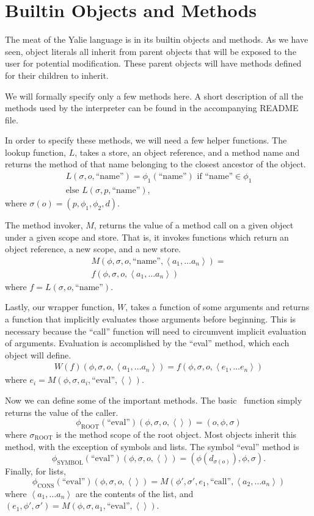\documentclass[twocolumn]{article}
\begin{document}
\section*{Builtin Objects and Methods}
The meat of the Yalie language is in its builtin objects and
methods. As we have seen, object literals all inherit from parent
objects that will be exposed to the user for potential
modification. These parent objects will have methods defined for their
children to inherit.

We will formally specify only a few methods here. A short description
of all the methods used by the interpreter can be found in the
accompanying README file.

In order to specify these methods, we will need a few helper
functions. The lookup function, $L$, takes a store, an object
reference, and a method name and returns the method of that name
belonging to the closest ancestor of the object.
\begin{multline*}
  L(\sigma,o,\text{``name''}) = \phi_1(\text{``name''}) \text{ if
  ``name''} \in \phi_1 \\\text{else }L(\sigma,p,\text{``name''}),
\end{multline*}
where $\sigma(o)=(p,\phi_1,\phi_2,d)$.

The method invoker, $M$, returns the value of a method call on a given
object under a given scope and store. That is, it invokes functions
which return an object reference, a new scope, and a new store.
\begin{multline*} M(\phi,\sigma,o,\text{``name''},\left<a_1,\ldots a_n\right>)
 =\\ f( \phi, \sigma, o, \left<a_1, \ldots a_n\right> )
\end{multline*}
where $f = L(\sigma,o,\text{``name''})$.

Lastly, our wrapper function, $W$, takes a function of some arguments
and returns a function that implicitly evaluates those arguments
before beginning. This is necessary because the ``call'' function will
need to circumvent implicit evaluation of arguments. Evaluation is
accomplished by the ``eval'' method, which each object will define.
\begin{multline*}
W(f)(\phi,\sigma,o,\left<a_1,\ldots a_n\right>) =
f(\phi,\sigma,o,\left<e_1,\ldots e_n\right>)
\end{multline*}
where $e_i = M(\phi,\sigma,a_i,\text{``eval''},\left<\right>)$.

Now we can define some of the important methods. The basic
\eval\ function simply returns the value of the caller.
\[ \phi_{\text{ROOT}}(\text{``eval''})(\phi,\sigma,o,\left<\right>) = 
(o,\phi,\sigma) \]
where $\sigma_{\text{ROOT}}$ is the method scope of the root
object. Most objects inherit this method, with the exception of
symbols and lists. The symbol ``eval'' method is
\[ \phi_{\text{SYMBOL}}(\text{``eval''})(\phi,\sigma,o,\left<\right>) = 
(\phi(d_{\sigma(o)}),\phi,\sigma). \]
Finally, for lists,
\[ \phi_{\text{CONS}}(\text{``eval''})(\phi,\sigma,o,\left<\right>) =
M(\phi',\sigma',e_1,\text{``call''},\left<a_2,\ldots a_n\right>) \]
where $\left< a_1,\ldots a_n\right>$ are the contents of the list, and
$(e_1,\phi',\sigma') = M(\phi,\sigma,a_1,\text{``eval''},\left<\right>)$.
\end{document}
